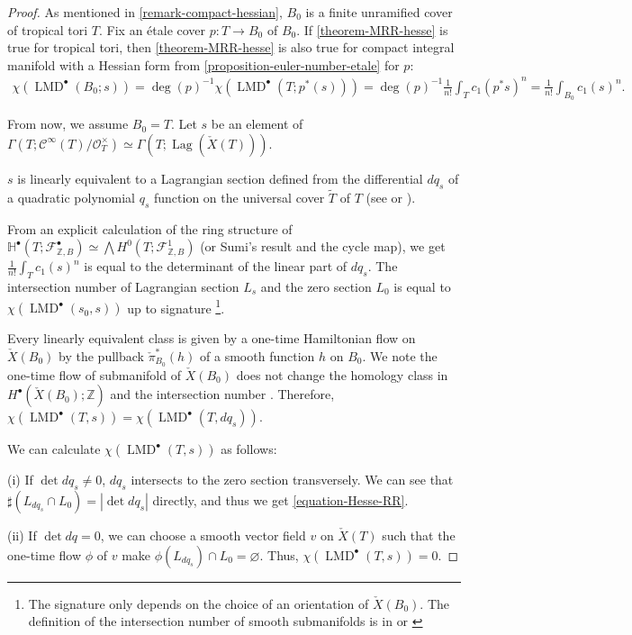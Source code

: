 \documentclass[a4paper,dvipdfmx,reqno,12pt]{amsart}
\theoremstyle{definition}
\newcommand{\emp}{\varnothing}%
\newcommand{\Z}{\mathbb{Z}}%
\newcommand{\mcal}[1]{\mathcal{#1}}%
\newcommand{\opn}[1]{\operatorname{#1}}
\newcommand{\myfootnote}[1]{\hspace{-5pt}\footnote{#1}}
\numberwithin{equation}{section}
\begin{document}
\begin{proof}

As mentioned in \cref{remark-compact-hessian},
$B_0$ is a finite unramified cover of tropical tori $T$.
Fix an \'etale cover $p:T \to B_0$ of $B_0$.
If \cref{theorem-MRR-hesse} is true for tropical tori,
then \cref{theorem-MRR-hesse} is also true for compact
integral manifold with a Hessian form from
\cref{proposition-euler-number-etale} for $p$:
\begin{align}
\chi(\opn{LMD}^{\bullet}(B_0;s))
=\opn{deg}(p)^{-1}\chi(\opn{LMD}^{\bullet}(T;p^{*}(s)))
=\opn{deg}(p)^{-1}\frac{1}{n!}\int_T c_1(p^{*}s)^{n}
=\frac{1}{n!}\int_{B_0}c_1(s)^{n}.
\end{align}

From now, we assume $B_0=T$.
Let $s$ be an element of 
$\Gamma(T;\mcal{C}^{\infty}(T)/\mcal{O}_{T}^{\times})\simeq
\Gamma(T;\opn{Lag}(\check{X}(T)))$.

$s$ is linearly equivalent to a Lagrangian section
defined from the differential $dq_s$ of a quadratic polynomial
$q_s$ function on the universal cover $\tilde{T}$ of $T$
(see \cite{mikhalkinTropicalCurvesTheir2008a} or 
\cite[3.3]{MR4229604}).

From an explicit calculation of the ring structure of
$\mathbb{H}^{\bullet}(T;\mathcal{F}_{\mathbb{Z},B}^{\bullet})
\simeq \bigwedge H^{0}(T;\mathcal{F}_{\mathbb{Z},B}^{1})$
(or Sumi's result
\cite[Theorem 47]{MR4229604} and the cycle map), 
we get 
$\frac{1}{n!}\int_{T}c_1(s)^{n}$ is equal to the determinant
of the linear part of $dq_s$. 
The intersection number of Lagrangian
section $L_s$ and the zero section $L_0$ is equal to
$\chi(\opn{LMD}^{\bullet}(s_0,s))$ up to 
signature
\myfootnote{The signature only depends on
the choice of 
an orientation of $\check{X}(B_0)$. 
The definition of the intersection number of smooth 
submanifolds is in \cite[5.2]{MR1336822} or 
\cite[0.4]{griffithsPrinciplesAlgebraicGeometry1994a}}. 

Every linearly equivalent 
class is given by a one-time Hamiltonian flow on 
$\check{X}(B_0)$ by the pullback $\check{\pi}_{B_0}^{*}(h)$
of a smooth function $h$ on $B_0$.
We note the one-time flow of submanifold of $\check{X}(B_0)$ does not change
the homology class in $H^{\bullet}(\check{X}(B_0);\Z)$ and
the intersection number \cite[5.2.1. Theorem]{MR1336822}.
Therefore, 
$\chi(\opn{LMD}^{\bullet}(T,s))=
\chi(\opn{LMD}^{\bullet}(T,dq_{s}))$.

We can calculate $\chi(\opn{LMD}^{\bullet}(T,s))$ as follows:

(i) If $\det dq_s\ne 0$, $dq_s$ intersects to 
the zero section transversely. We can see that 
$\sharp(L_{dq_s}\cap L_0)=|\det dq_s|$ directly, and thus
we get \cref{equation-Hesse-RR}. 

(ii) If $\det dq=0$, we can choose a smooth vector field
 $v$ on $\check{X}(T)$ such that the one-time flow 
$\phi$ of $v$ make 
$\phi(L_{dq_s})\cap L_0=\emp$. 
Thus, $\chi(\opn{LMD}^{\bullet}(T,s))=0$.
\end{proof}
\end{document}
